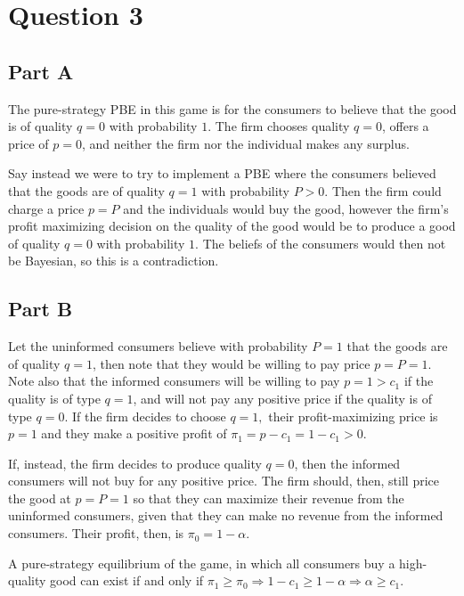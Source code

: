 \documentclass[11pt]{article} %
\begin{document}
\section{Question 3}
\subsection{Part A}
The pure-strategy PBE in this game is for the consumers to believe that the good is of quality $q=0$ with probability $1$. The firm chooses quality $q=0$, offers a price of $p = 0$, and neither the firm nor the individual makes any surplus. 

Say instead we were to try to implement a PBE where the consumers believed that the goods are of quality $q=1$ with probability $P>0$. Then the firm could charge a price $p = P$ and the individuals would buy the good, however the firm's profit maximizing decision on the quality of the good would be to produce a good of quality $q=0$ with probability $1$. The beliefs of the consumers would then not be Bayesian, so this is a contradiction.
\subsection{Part B}
Let the uninformed consumers believe with probability $P=1$ that the goods are of quality $q=1$, then note that they would be willing to pay price $p=P=1$. Note also that the informed consumers will be willing to pay $p=1>c_1$ if the quality is of type $q=1$, and will not pay any positive price if the quality is of type $q=0$. If the firm decides to choose $q=1,$ their profit-maximizing price is $p=1$ and they make a positive profit of $\pi_1 = p-c_1 = 1-c_1>0$.

If, instead, the firm decides to produce quality $q=0$, then the informed consumers will not buy for any positive price. The firm should, then, still price the good at $p = P = 1$ so that they can maximize their revenue from the uninformed consumers, given that they can make no revenue from the informed consumers. Their profit, then, is $\pi_0 = 1-\alpha$.

A pure-strategy equilibrium of the game, in which all consumers buy a high-quality good can exist if and only if $\pi_1\geq \pi_0\Rightarrow 1-c_1 \geq 1-\alpha \Rightarrow \alpha \geq c_1$.
\end{document}
